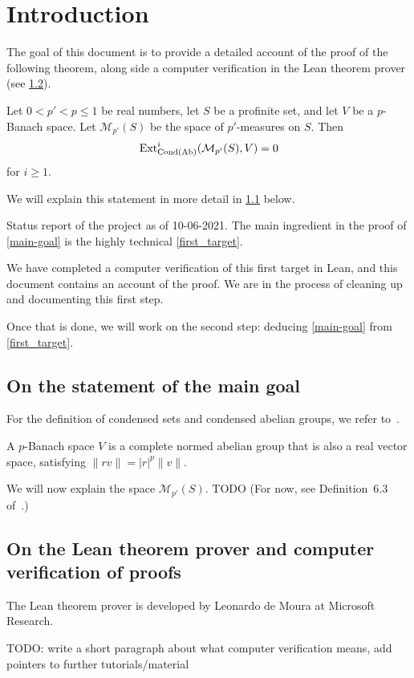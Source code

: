 \section{Introduction}
\label{intro}

The goal of this document is to provide a detailed account
of the proof of the following theorem,
along side a computer verification in the Lean theorem prover
(see \cref{on-lean}).

\begin{theorem}
  \label{main-goal}
  Let $0 < p' < p \le 1$ be real numbers,
  let $S$ be a profinite set,
  and let $V$ be a $p$-Banach space.
  Let $\mathcal M_{p'}(S)$ be the space of $p'$-measures on $S$.
  Then
  \[
    \operatorname{Ext}^i_{\operatorname{Cond}(\operatorname{Ab})}(\mathcal M_{p'}(S), V)=0
  \]
  for $i \ge 1$.
\end{theorem}

We will explain this statement in more detail in \cref{on-the-statement} below.

\begin{remark}
  Status report of the project as of 10-06-2021.
  The main ingredient in the proof of \cref{main-goal}
  is the highly technical \cref{first_target}.

  We have completed a computer verification of this first target in Lean,
  and this document contains an account of the proof.
  We are in the process of cleaning up and documenting this first step.

  Once that is done, we will work on the second step:
  deducing \cref{main-goal} from \cref{first_target}.
\end{remark}

\subsection{On the statement of the main goal}
\label{on-the-statement}

For the definition of condensed sets and condensed abelian groups,
we refer to~\cite{Condensed}.

A $p$-Banach space $V$ is a complete normed abelian group
that is also a real vector space,
satisfying $\|rv\| = |r|^p\|v\|$.

We will now explain the space $\mathcal M_{p'}(S)$.
TODO
(For now, see Definition~6.3 of~\cite{Analytic}.)

\subsection{On the Lean theorem prover and computer verification of proofs}
\label{on-lean}

The Lean theorem prover is developed by Leonardo de Moura
at Microsoft Research.

TODO: write a short paragraph about what computer verification means,
add pointers to further tutorials/material

